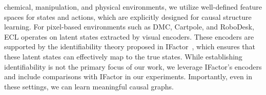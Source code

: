 
 chemical, manipulation, and physical environments, we utilize well-defined feature spaces for states and actions, which are explicitly designed for causal structure learning. For pixel-based environments such as DMC, Cartpole, and RoboDesk, ECL operates on latent states extracted by visual encoders. These encoders are supported by the identifiability theory proposed in IFactor~\citep{liu2024learning}, which ensures that these latent states can effectively map to the true states. While establishing identifiability is not the primary focus of our work, we leverage IFactor's encoders and include comparisons with IFactor in our experiments. Importantly, even in these settings, we can learn meaningful causal graphs. 


